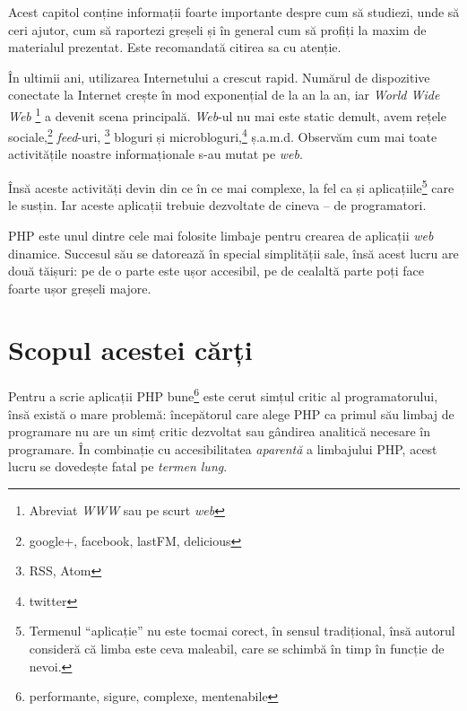 
\begin{chapsummary}

Acest capitol conține informații foarte importante despre cum să studiezi, unde
să ceri ajutor, cum să raportezi greșeli și în general cum să profiți la maxim
de materialul prezentat. Este recomandată citirea sa cu atenție.

\end{chapsummary}

În ultimii ani, utilizarea Internetului a crescut rapid. Numărul de dispozitive
conectate la Internet crește în mod exponențial de la an la an, iar
\textsl{World Wide Web}
\footnote{Abreviat
    \textsl{WWW} sau pe scurt
    \textsl{web}
}
a devenit scena principală. \textit{Web}-ul nu mai este static demult, avem rețele
sociale,\footnote{google+, facebook, lastFM, delicious} \textsl{feed}-uri,
\footnote{RSS,
Atom}
bloguri și microbloguri,\footnote{twitter} ș.a.m.d. Observăm cum mai
toate activitățile noastre informaționale s-au mutat pe \textit{web}.

Însă aceste activități devin din ce în ce mai complexe, la fel ca și
aplicațiile\footnote{Termenul ``aplicație'' nu este tocmai corect, în sensul
tradițional, însă autorul consideră că limba este ceva maleabil, care se
schimbă în timp în funcție de nevoi.} care le susțin.  Iar aceste aplicații
trebuie dezvoltate de cineva -- de programatori.

PHP este unul dintre cele mai folosite limbaje pentru crearea de aplicații \textit{web}
dinamice. Succesul său se datorează în special simplității sale, însă acest
lucru are două tăișuri: pe de o parte este ușor accesibil, pe de cealaltă parte
poți face foarte ușor greșeli majore.

\section*{Scopul acestei cărți}
{}

Pentru a scrie aplicații PHP bune\footnote{performante, sigure, complexe,
mentenabile} este cerut simțul critic al programatorului, însă există o mare
problemă: începătorul care alege PHP ca primul său limbaj de programare nu are
un simț critic dezvoltat sau gândirea analitică necesare în programare. În
combinație cu accesibilitatea \textit{aparentă} a limbajului PHP, acest lucru
se dovedește fatal pe \textit{termen lung}.

